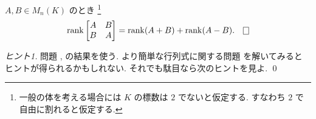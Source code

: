 \documentclass[12pt,twoside]{jarticle}
\begin{document}

\begin{question}
  \label{q:rank-ABBA}
  $A,B\in M_n(K)$ のとき%
  \footnote{一般の体を考える場合には $K$ の標数は $2$ でないと仮定する.
    すなわち $2$ で自由に割れると仮定する.}
  \begin{equation*}
    \rank
    \begin{bmatrix}
      A & B \\
      B & A \\
    \end{bmatrix}
    = \rank(A+B) + \rank(A-B).
    \qed
  \end{equation*}
\end{question}

\begin{proof}[ヒント1]
  問題 ,  の結果を使う.
  より簡単な行列式に関する問題  を解いてみると
  ヒントが得られるかもしれない. それでも駄目なら次のヒントを見よ.
  \qed
\end{proof}
\end{document}
